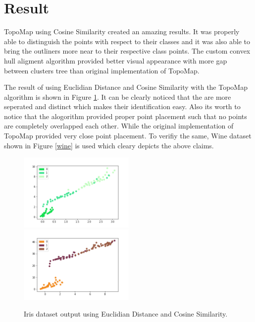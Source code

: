\documentclass[a4paper]{article}
\begin{document}
  \section{Result}

  TopoMap\cite{topomap} using Cosine Similarity created an amazing results. It was properly able to distinguish the points with respect to their classes and it was also able to bring the outliners more near to their respective class points. The custom convex hull aligment algorithm provided better visual appearance with more gap between clusters tree than original implementation of TopoMap\cite{topomap}.

  The result of using Euclidian Distance and Cosine Similarity with the TopoMap\cite{topomap} algorithm is shown in Figure \ref{iris}. It can be clearly noticed that the are more seperated and distinct which makes their identification easy. Also its worth to notice that the alogorithm provided proper point placement such that no points are completely overlapped each other. While the original implementation of TopoMap provided very close point placement. To verifiy the same, Wine dataset shown in Figure \ref{wine} is used which cleary depicts the above claims.
  
  \cite{topomap}

  \begin{figure}[htb]
    \includegraphics[width=0.5\textwidth]{../output/iris_euclidian_distance_1.png}
    \includegraphics[width=0.5\textwidth]{../output/iris_angle_1.png}
    \caption{Iris dataset output using Euclidian Distance and Cosine Similarity.}
    \label{iris}
  \end{figure}
\end{document}
